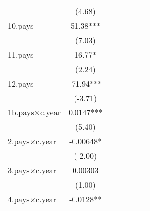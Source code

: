 {\begin{tabular}{l*{6}{c}}
                    &      (4.68)         &                     &                     &                     &                     &                     \\
[1em]
10.pays             &       51.38***&                     &                     &                     &                     &                     \\
                    &      (7.03)         &                     &                     &                     &                     &                     \\
[1em]
11.pays             &       16.77*  &                     &                     &                     &                     &                     \\
                    &      (2.24)         &                     &                     &                     &                     &                     \\
[1em]
12.pays             &      -71.94***&                     &                     &                     &                     &                     \\
                    &     (-3.71)         &                     &                     &                     &                     &                     \\
[1em]
1b.pays$\times$c.year      &      0.0147***&                     &                     &                     &                     &                     \\
                    &      (5.40)         &                     &                     &                     &                     &                     \\
[1em]
2.pays$\times$c.year       &    -0.00648*  &                     &                     &                     &                     &                     \\
                    &     (-2.00)         &                     &                     &                     &                     &                     \\
[1em]
3.pays$\times$c.year       &     0.00303         &                     &                     &                     &                     &                     \\
                    &      (1.00)         &                     &                     &                     &                     &                     \\
[1em]
4.pays$\times$c.year       &     -0.0128** &                     &                     &                     &                     &                     \\

\end{tabular}}
